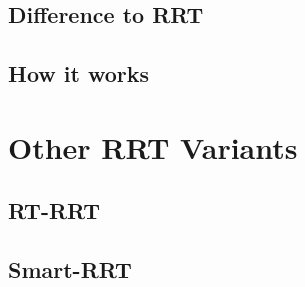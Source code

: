 \subsection{Difference to RRT}

\subsection{How it works}

\section{Other RRT Variants}

\subsection{RT-RRT}

\subsection{Smart-RRT}
